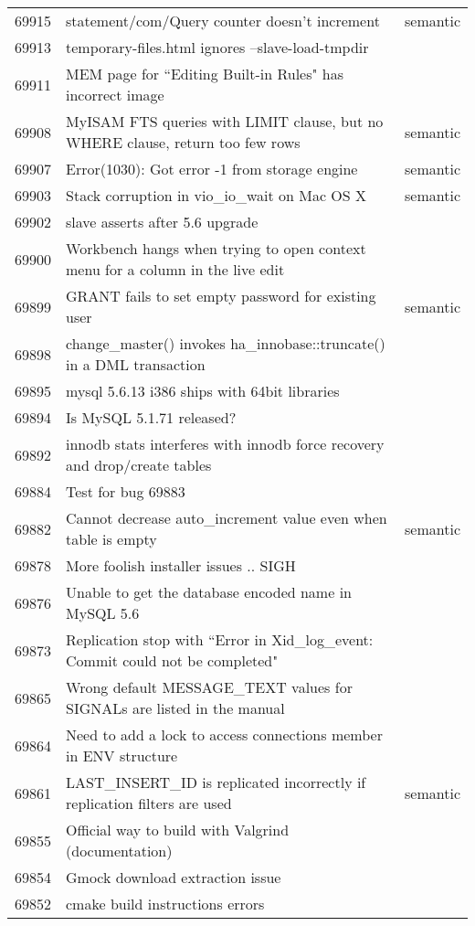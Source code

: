 \begin{longtable}[c]{p{1cm}p{8cm}p{3cm}}
69915 & statement/com/Query counter doesn't increment & semantic \\
69913 & temporary-files.html ignores --slave-load-tmpdir &  \\
69911 & MEM page for ``Editing Built-in Rules" has incorrect image &  \\
69908 & MyISAM FTS queries with LIMIT clause, but no WHERE clause, return too few rows & semantic \\
69907 & Error(1030): Got error -1 from storage engine & semantic \\
69903 & Stack corruption in vio\_io\_wait on Mac OS X & semantic \\
69902 & slave asserts after 5.6 upgrade &  \\
69900 & Workbench hangs when trying to open context menu for a column in the live edit &  \\
69899 & GRANT fails to set empty password for existing user & semantic \\
69898 & change\_master() invokes ha\_innobase::truncate() in a DML transaction &  \\
69895 & mysql 5.6.13 i386 ships with 64bit libraries &  \\
69894 & Is MySQL 5.1.71 released? &  \\
69892 & innodb stats interferes with innodb force recovery and drop/create tables &  \\
69884 & Test for bug 69883 &  \\
69882 & Cannot decrease auto\_increment value even when table is empty & semantic \\
69878 & More foolish installer issues .. SIGH &  \\
69876 & Unable to get the database encoded name in MySQL 5.6 &  \\
69873 & Replication stop with ``Error in Xid\_log\_event: Commit could not be completed" &  \\
69865 & Wrong default MESSAGE\_TEXT values for SIGNALs are listed in the manual &  \\
69864 & Need to add a lock to access connections member in ENV structure &  \\
69861 & LAST\_INSERT\_ID is replicated incorrectly if replication filters are used & semantic \\
69855 & Official way to build with Valgrind (documentation) &  \\
69854 & Gmock download extraction issue &  \\
69852 & cmake build instructions errors &  \\

\end{longtable}

